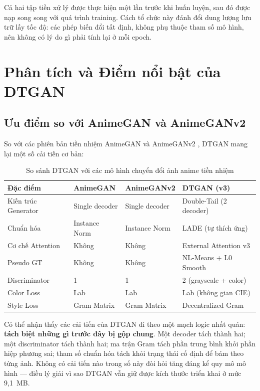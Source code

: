 Cả hai tập tiền xử lý được thực hiện một lần trước khi huấn luyện, sau đó được nạp song song với quá trình training. Cách tổ chức này đánh đổi dung lượng lưu trữ lấy tốc độ: các phép biến đổi tất định, không phụ thuộc tham số mô hình, nên không có lý do gì phải tính lại ở mỗi epoch.

\section{Phân tích và Điểm nổi bật của DTGAN}
\label{sec:dtgan_analysis}

\subsection{Ưu điểm so với AnimeGAN và AnimeGANv2}
\label{subsec:advantages}

So với các phiên bản tiền nhiệm AnimeGAN \cite{Chen2020} và AnimeGANv2 \cite{ChenLiu2020}, DTGAN mang lại một số cải tiến cơ bản:

\begin{table}[H]
\caption{So sánh DTGAN với các mô hình chuyển đổi ảnh anime tiền nhiệm}
\label{tab:model_comparison}
\centering
\begin{tabular}{|p{3.5cm}|p{2.8cm}|p{2.8cm}|p{4cm}|}
\hline
\textbf{Đặc điểm} & \textbf{AnimeGAN} & \textbf{AnimeGANv2} & \textbf{DTGAN (v3)} \\
\hline
Kiến trúc Generator & Single decoder & Single decoder & Double-Tail (2 decoder) \\
\hline
Chuẩn hóa & Instance Norm & Instance Norm & LADE (tự thích ứng) \\
\hline
Cơ chế Attention & Không & Không & External Attention v3 \\
\hline
Pseudo GT & Không & Không & NL-Means + L0 Smooth \\
\hline
Discriminator & 1 & 1 & 2 (grayscale + color) \\
\hline
Color Loss & Lab & Lab & Lab (không gian CIE) \\
\hline
Style Loss & Gram Matrix & Gram Matrix & Decentralized Gram \\
\hline
\end{tabular}
\end{table}

Có thể nhận thấy các cải tiến của DTGAN đi theo một mạch logic nhất quán: \textbf{tách biệt những gì trước đây bị gộp chung}. Một decoder tách thành hai; một discriminator tách thành hai; ma trận Gram tách phần trung bình khỏi phần hiệp phương sai; tham số chuẩn hóa tách khỏi trạng thái cố định để bám theo từng ảnh. Không có cải tiến nào trong số này đòi hỏi tăng đáng kể quy mô mô hình --- điều lý giải vì sao DTGAN vẫn giữ được kích thước triển khai ở mức 9,1~MB.

